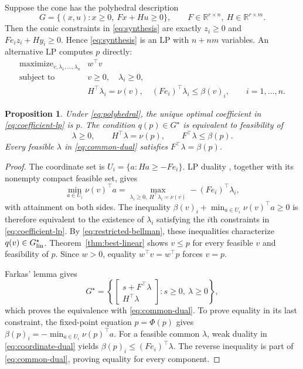 \documentclass[10pt]{article}
\newtheorem{proposition}{Proposition}
\newcommand{\R}{\mathbb R}
\begin{document}
Suppose the cone has the polyhedral description
\begin{equation}
 G=\{(x,u):x\ge0,\ F x+Hu\ge0\},
 \qquad F\in\R^{r\times n},\ H\in\R^{r\times m}.
 \label{eq:polyhedral}
\end{equation}
Then the conic constraints in \eqref{eq:synthesis} are exactly $z_i\ge0$ and $F e_i z_i+Hy_i\ge0$. Hence \eqref{eq:synthesis} is an LP with $n+nm$ variables. An alternative LP computes $p$ directly:
\begin{equation}
 \begin{array}{ll}
 \operatorname{maximize}_{v,\lambda_1,\ldots,\lambda_n}&w^\top v\\
 \operatorname{subject\ to}&v\ge0,\quad\lambda_i\ge0,\\
 &H^\top\lambda_i=\nu(v),\quad
   (F e_i)^\top\lambda_i\le\beta(v)_i,
   \qquad i=1,\ldots,n.
 \end{array}
 \label{eq:coefficient-lp}
\end{equation}

\begin{proposition}
\label{prop:lp}
Under \eqref{eq:polyhedral}, the unique optimal coefficient in \eqref{eq:coefficient-lp} is $p$. The condition $q(p)\in G^\star$ is equivalent to feasibility of
\begin{equation}
 \lambda\ge0,\qquad H^\top\lambda=\nu(p),\qquad
 F^\top\lambda\le\beta(p).
 \label{eq:common-dual}
\end{equation}
Every feasible $\lambda$ in \eqref{eq:common-dual} satisfies $F^\top\lambda=\beta(p)$.
\end{proposition}
\begin{proof}
The coordinate set is $U_i=\{a:Ha\ge-F e_i\}$. LP duality \cite[Chapter~5]{boyd-vandenberghe}, together with its nonempty compact feasible set, gives
\begin{equation}
 \min_{a\in U_i}\nu(v)^\top a
 =\max_{\lambda_i\ge0,\ H^\top\lambda_i=\nu(v)}
       -(F e_i)^\top\lambda_i,
 \label{eq:coordinate-dual}
\end{equation}
with attainment on both sides. The inequality $\beta(v)_i+\min_{a\in U_i}\nu(v)^\top a\ge0$ is therefore equivalent to the existence of $\lambda_i$ satisfying the $i$th constraints in \eqref{eq:coefficient-lp}. By \eqref{eq:restricted-bellman}, these inequalities characterize $q(v)\in G_{\rm lin}^\star$. Theorem~\ref{thm:best-linear} shows $v\le p$ for every feasible $v$ and feasibility of $p$. Since $w>0$, equality $w^\top v=w^\top p$ forces $v=p$.

Farkas' lemma gives
\[
 G^\star=\left\{\begin{bmatrix}s+F^\top\lambda\\H^\top\lambda\end{bmatrix}:
                 s\ge0,\ \lambda\ge0\right\},
\]
which proves the equivalence with \eqref{eq:common-dual}. To prove equality in its last constraint, the fixed-point equation $p=\Phi(p)$ gives $\beta(p)_i=-\min_{a\in U_i}\nu(p)^\top a$. For a feasible common $\lambda$, weak duality in \eqref{eq:coordinate-dual} yields $\beta(p)_i\le(F e_i)^\top\lambda$. The reverse inequality is part of \eqref{eq:common-dual}, proving equality for every component.
\end{proof}
\end{document}
